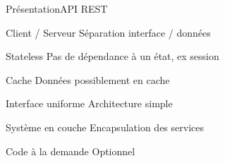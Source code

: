 \begin{frame}{Présentation}{API REST}
    \begin{minipage}{0.45\textwidth}
    \begin{block}{Client / Serveur}
        Séparation interface / données
    \end{block}
    \end{minipage}
    \begin{minipage}{0.45\textwidth}
    \begin{block}{Stateless}
        Pas de dépendance à un état, ex session
    \end{block}
    \end{minipage}
    \begin{minipage}{0.45\textwidth}
    \begin{block}{Cache}
        Données possiblement en cache
    \end{block}
    \end{minipage}
    \begin{minipage}{0.45\textwidth}
    \begin{block}{Interface uniforme}
        Architecture simple
    \end{block}
    \end{minipage}
    \begin{minipage}{0.45\textwidth}
    \begin{block}{Système en couche}
        Encapsulation des services
    \end{block}
    \end{minipage}
    \begin{minipage}{0.45\textwidth}
    \begin{alertblock}{Code à la demande}
        \alert{Optionnel}
    \end{alertblock}
    \end{minipage}
\end{frame}